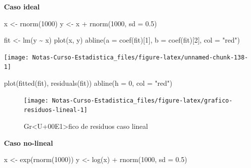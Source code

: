 \documentclass[
  12pt,
]{book}
\newenvironment{Shaded}{\begin{snugshade}}{\end{snugshade}}
\newcommand{\AttributeTok}[1]{\textcolor[rgb]{0.77,0.63,0.00}{#1}}
\newcommand{\DecValTok}[1]{\textcolor[rgb]{0.00,0.00,0.81}{#1}}
\newcommand{\FloatTok}[1]{\textcolor[rgb]{0.00,0.00,0.81}{#1}}
\newcommand{\FunctionTok}[1]{\textcolor[rgb]{0.00,0.00,0.00}{#1}}
\newcommand{\NormalTok}[1]{#1}
\newcommand{\OtherTok}[1]{\textcolor[rgb]{0.56,0.35,0.01}{#1}}
\newcommand{\SpecialCharTok}[1]{\textcolor[rgb]{0.00,0.00,0.00}{#1}}
\newcommand{\StringTok}[1]{\textcolor[rgb]{0.31,0.60,0.02}{#1}}
\begin{document}
\begin{example}

\textbf{Caso ideal}

\begin{Shaded}
\begin{Highlighting}[]
\NormalTok{x }\OtherTok{\textless{}{-}} \FunctionTok{rnorm}\NormalTok{(}\DecValTok{1000}\NormalTok{)}
\NormalTok{y }\OtherTok{\textless{}{-}}\NormalTok{ x }\SpecialCharTok{+} \FunctionTok{rnorm}\NormalTok{(}\DecValTok{1000}\NormalTok{, }\AttributeTok{sd =} \FloatTok{0.5}\NormalTok{)}

\NormalTok{fit }\OtherTok{\textless{}{-}} \FunctionTok{lm}\NormalTok{(y }\SpecialCharTok{\textasciitilde{}}\NormalTok{ x)}
\FunctionTok{plot}\NormalTok{(x, y)}
\FunctionTok{abline}\NormalTok{(}\AttributeTok{a =} \FunctionTok{coef}\NormalTok{(fit)[}\DecValTok{1}\NormalTok{], }\AttributeTok{b =} \FunctionTok{coef}\NormalTok{(fit)[}\DecValTok{2}\NormalTok{], }\AttributeTok{col =} \StringTok{"red"}\NormalTok{)}
\end{Highlighting}
\end{Shaded}

\begin{center}\texttt{[image: Notas-Curso-Estadistica\_files/figure-latex/unnamed-chunk-138-1]} \end{center}

\begin{Shaded}
\begin{Highlighting}[]
\FunctionTok{plot}\NormalTok{(}\FunctionTok{fitted}\NormalTok{(fit), }\FunctionTok{residuals}\NormalTok{(fit))}
\FunctionTok{abline}\NormalTok{(}\AttributeTok{h =} \DecValTok{0}\NormalTok{, }\AttributeTok{col =} \StringTok{"red"}\NormalTok{)}
\end{Highlighting}
\end{Shaded}

\begin{figure}

{\centering \texttt{[image: Notas-Curso-Estadistica\_files/figure-latex/grafico-residuos-lineal-1]} 

}

\caption{Gr<U+00E1>fico de residuos caso lineal}\label{fig:grafico-residuos-lineal}
\end{figure}

\textbf{Caso no-lineal}

\begin{Shaded}
\begin{Highlighting}[]
\NormalTok{x }\OtherTok{\textless{}{-}} \FunctionTok{exp}\NormalTok{(}\FunctionTok{rnorm}\NormalTok{(}\DecValTok{1000}\NormalTok{))}
\NormalTok{y }\OtherTok{\textless{}{-}} \FunctionTok{log}\NormalTok{(x) }\SpecialCharTok{+} \FunctionTok{rnorm}\NormalTok{(}\DecValTok{1000}\NormalTok{, }\AttributeTok{sd =} \FloatTok{0.5}\NormalTok{)}


\end{Highlighting}
\end{Shaded}
\end{example}
\end{document}
